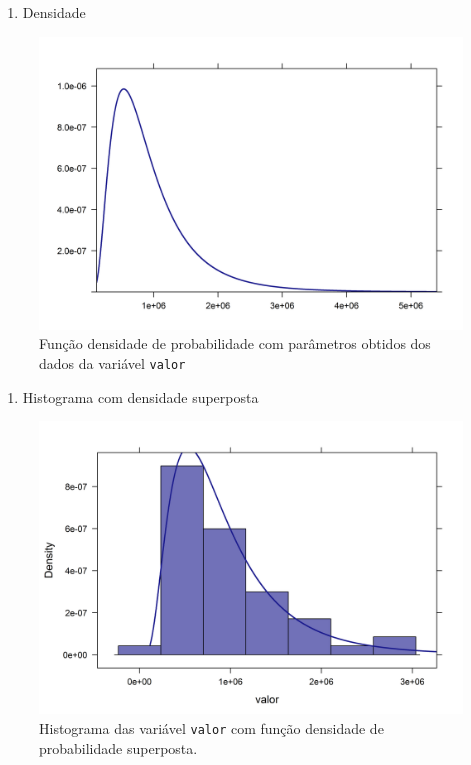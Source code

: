 \documentclass[a4paper]{article}
\providecommand{\tightlist}{%
  \setlength{\itemsep}{0pt}\setlength{\parskip}{0pt}}
\let\code=\texttt
\begin{document}
\newpage

\begin{enumerate}
\def\labelenumi{\alph{enumi}.}
\tightlist
\item
  Densidade
\end{enumerate}

\begin{figure}[H]

{\centering \includegraphics[width=0.7\linewidth]{images/densidade-1} 

}

\caption{Função densidade de probabilidade com parâmetros obtidos dos dados da variável \code{valor}}\label{fig:densidade}
\end{figure}

\begin{enumerate}
\def\labelenumi{\alph{enumi}.}
\setcounter{enumi}{1}
\tightlist
\item
  Histograma com densidade superposta
\end{enumerate}

\begin{figure}[H]

{\centering \includegraphics[width=0.7\linewidth]{images/hist_densidade-1} 

}

\caption{Histograma das variável \code{valor} com função densidade de probabilidade superposta.}\label{fig:hist_densidade}
\end{figure}
\end{document}
